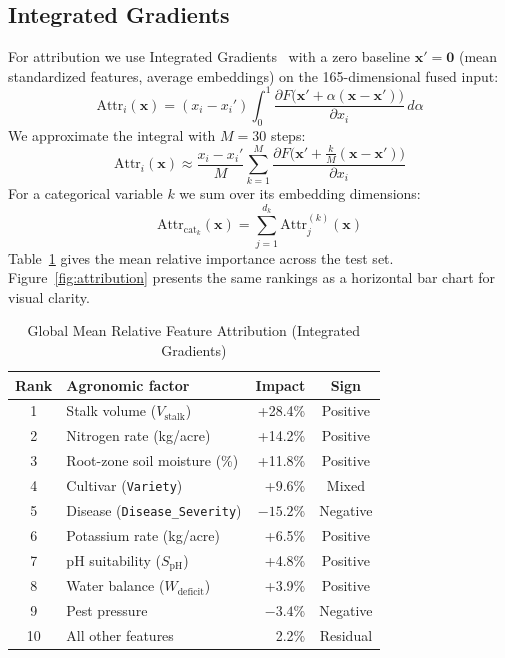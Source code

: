 \documentclass[conference,10pt,letterpaper]{IEEEtran}
\begin{document}
\subsection{Integrated Gradients}
For attribution we use Integrated Gradients~\cite{sundararajan2017axiomatic} with a zero baseline $\mathbf{x}' = \mathbf{0}$ (mean standardized features, average embeddings) on the 165-dimensional fused input:
\begin{equation}
\text{Attr}_i(\mathbf{x}) = (x_i - x_i') \int_{0}^{1} \frac{\partial F\big(\mathbf{x}' + \alpha(\mathbf{x} - \mathbf{x}')\big)}{\partial x_i}\, d\alpha
\end{equation}
We approximate the integral with $M = 30$ steps:
\begin{equation}
\text{Attr}_i(\mathbf{x}) \approx \frac{x_i - x_i'}{M} \sum_{k=1}^M \frac{\partial F\big(\mathbf{x}' + \tfrac{k}{M}(\mathbf{x} - \mathbf{x}')\big)}{\partial x_i}
\end{equation}
For a categorical variable $k$ we sum over its embedding dimensions:
\begin{equation}
\text{Attr}_{\text{cat}_k}(\mathbf{x}) = \sum_{j=1}^{d_k} \text{Attr}_{j}^{(k)}(\mathbf{x})
\end{equation}
Table~\ref{tab:attributions} gives the mean relative importance across the test set. Figure~\ref{fig:attribution} presents the same rankings as a horizontal bar chart for visual clarity.

\begin{table}[htbp]
\caption{Global Mean Relative Feature Attribution (Integrated Gradients)}
\label{tab:attributions}
\centering
\footnotesize
\setlength{\tabcolsep}{3.5pt}
\begin{tabular*}{\columnwidth}{@{\extracolsep{\fill}}clrc@{}}
\toprule
\textbf{Rank} & \textbf{Agronomic factor} & \textbf{Impact} & \textbf{Sign} \\
\midrule
1  & Stalk volume ($V_{\text{stalk}}$)        & +28.4\% & Positive \\
2  & Nitrogen rate (kg/acre)                  & +14.2\% & Positive \\
3  & Root-zone soil moisture (\%)             & +11.8\% & Positive \\
4  & Cultivar (\texttt{Variety})              & +9.6\%  & Mixed \\
5  & Disease (\texttt{Disease\_Severity})     & $-15.2$\% & Negative \\
6  & Potassium rate (kg/acre)                 & +6.5\%  & Positive \\
7  & pH suitability ($S_{\text{pH}}$)         & +4.8\%  & Positive \\
8  & Water balance ($W_{\text{deficit}}$)     & +3.9\%  & Positive \\
9  & Pest pressure                            & $-3.4$\% & Negative \\
10 & All other features                       & 2.2\%   & Residual \\
\bottomrule
\end{tabular*}
\end{table}
\end{document}
